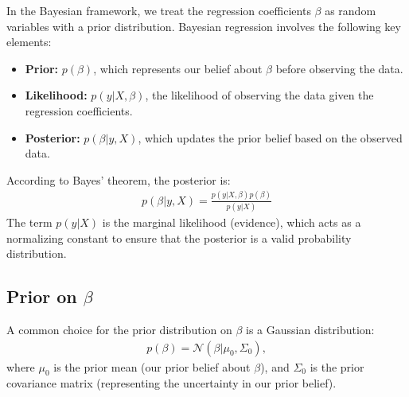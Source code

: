 In the Bayesian framework, we treat the regression coefficients $\beta$ as random variables with a prior distribution. Bayesian regression involves the following key elements:

\begin{itemize}
    \item \textbf{Prior:} $ p(\beta) $, which represents our belief about $\beta$ before observing the data.
    \item \textbf{Likelihood:} $ p(y | X, \beta) $, the likelihood of observing the data given the regression coefficients.
    \item \textbf{Posterior:} $ p(\beta | y, X) $, which updates the prior belief based on the observed data.
\end{itemize}

According to Bayes’ theorem, the posterior is:
\begin{align*}
	p(\beta | y, X) = \frac{p(y | X, \beta) p(\beta)}{p(y | X)}
\end{align*}
The term $ p(y | X) $ is the marginal likelihood (evidence), which acts as a normalizing constant to ensure that the posterior is a valid probability distribution.

\subsection{Prior on $\beta$}

A common choice for the prior distribution on $\beta$ is a Gaussian distribution:
\begin{align*}
	p(\beta) = \mathcal{N}(\beta | \mu_0, \Sigma_0),
\end{align*}
where $\mu_0$ is the prior mean (our prior belief about $\beta$), and $\Sigma_0$ is the prior covariance matrix (representing the uncertainty in our prior belief).


